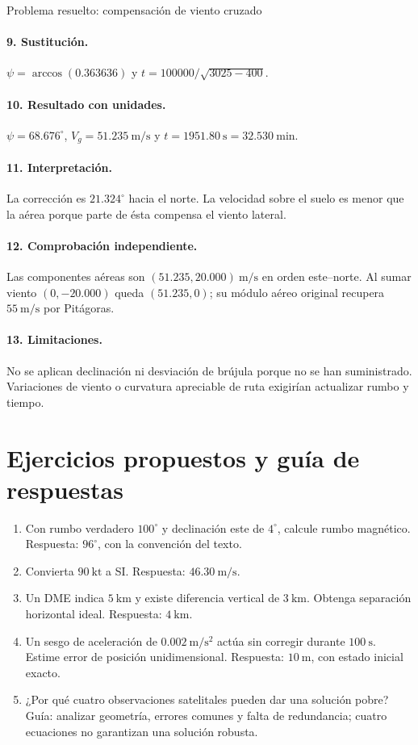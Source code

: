 \begin{studiumworked}{Problema resuelto: compensación de viento cruzado}
\paragraph{9. Sustitución.} $\psi=\arccos(0.363636)$ y $t=100000/\sqrt{3025-400}$.
\paragraph{10. Resultado con unidades.} $\psi=68.676^\circ$, $V_g=51.235\ \mathrm{m/s}$ y $t=1951.80\ \mathrm s=32.530\ \mathrm{min}$.
\paragraph{11. Interpretación.} La corrección es $21.324^\circ$ hacia el norte. La velocidad sobre el suelo es menor que la aérea porque parte de ésta compensa el viento lateral.
\paragraph{12. Comprobación independiente.} Las componentes aéreas son $(51.235,20.000)\ \mathrm{m/s}$ en orden este--norte. Al sumar viento $(0,-20.000)$ queda $(51.235,0)$; su módulo aéreo original recupera $55\ \mathrm{m/s}$ por Pitágoras.
\paragraph{13. Limitaciones.} No se aplican declinación ni desviación de brújula porque no se han suministrado. Variaciones de viento o curvatura apreciable de ruta exigirían actualizar rumbo y tiempo.


\end{studiumworked}

\section{Ejercicios propuestos y guía de respuestas}
\begin{enumerate}
\item Con rumbo verdadero $100^\circ$ y declinación este de $4^\circ$, calcule rumbo magnético. Respuesta: $96^\circ$, con la convención del texto.
\item Convierta $90\ \mathrm{kt}$ a SI. Respuesta: $46.30\ \mathrm{m/s}$.
\item Un DME indica $5\ \mathrm{km}$ y existe diferencia vertical de $3\ \mathrm{km}$. Obtenga separación horizontal ideal. Respuesta: $4\ \mathrm{km}$.
\item Un sesgo de aceleración de $0.002\ \mathrm{m/s^2}$ actúa sin corregir durante $100\ \mathrm s$. Estime error de posición unidimensional. Respuesta: $10\ \mathrm m$, con estado inicial exacto.
\item ¿Por qué cuatro observaciones satelitales pueden dar una solución pobre? Guía: analizar geometría, errores comunes y falta de redundancia; cuatro ecuaciones no garantizan una solución robusta.
\end{enumerate}
